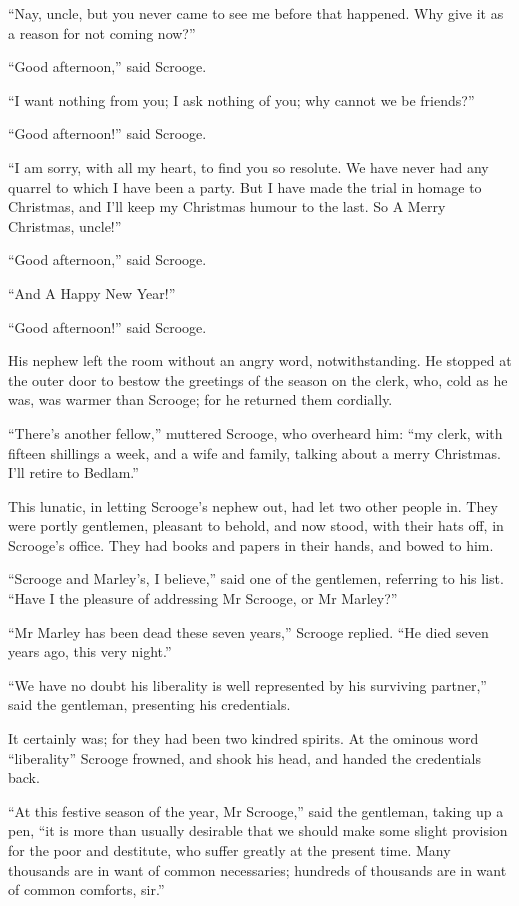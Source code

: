 \documentclass[paper=5.5in:8.5in,BCOR=10mm,twoside,DIV=15,12pt,usegeometry,openany]{scrbook} %
\begin{document}
\enquote{Nay, uncle, but you never came to see me before that happened. Why give it as a reason for not coming now?}

\enquote{Good afternoon,} said Scrooge.

\enquote{I want nothing from you; I ask nothing of you; why cannot we be friends?}

\enquote{Good afternoon!} said Scrooge.

\enquote{I am sorry, with all my heart, to find you so resolute. We have never had any quarrel to which I have been a party. But I have made the trial in homage to Christmas, and I'll keep my Christmas humour to the last. So A Merry Christmas, uncle!}

\enquote{Good afternoon,} said Scrooge.

\enquote{And A Happy New Year!}

\enquote{Good afternoon!} said Scrooge.

His nephew left the room without an angry word, notwithstanding. He stopped at the outer door to bestow the greetings of the season on the clerk, who, cold as he was, was warmer than Scrooge; for he returned them cordially.

\enquote{There's another fellow,} muttered Scrooge, who overheard him: \enquote{my clerk, with fifteen shillings a week, and a wife and family, talking about a merry Christmas. I'll retire to Bedlam.}

This lunatic, in letting Scrooge's nephew out, had let two other people in. They were portly gentlemen, pleasant to behold, and now stood, with their hats off, in Scrooge's office. They had books and papers in their hands, and bowed to him.

\enquote{Scrooge and Marley's, I believe,} said one of the gentlemen, referring to his list. \enquote{Have I the pleasure of addressing Mr Scrooge, or Mr Marley?}

\enquote{Mr Marley has been dead these seven years,} Scrooge replied. \enquote{He died seven years ago, this very night.}

\enquote{We have no doubt his liberality is well represented by his surviving partner,} said the gentleman, presenting his credentials.

It certainly was; for they had been two kindred spirits. At the ominous word \enquote{liberality} Scrooge frowned, and shook his head, and handed the credentials back.

\enquote{At this festive season of the year, Mr Scrooge,} said the gentleman, taking up a pen, \enquote{it is more than usually desirable that we should make some slight provision for the poor and destitute, who suffer greatly at the present time. Many thousands are in want of common necessaries; hundreds of thousands are in want of common comforts, sir.}
\end{document}
